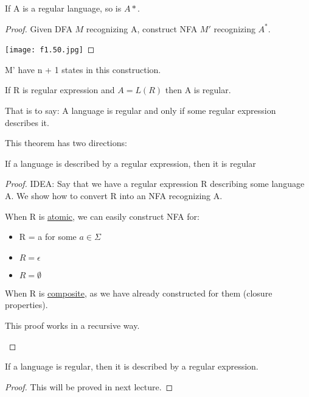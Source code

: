 \begin{theorem}
    If A is a regular language, so is \(A*\).  
\end{theorem}
\begin{proof}
    Given DFA \(M\) recognizing A, construct NFA \(M'\) recognizing \(A^*\). 

    \texttt{[image: f1.50.jpg]}
\end{proof}
\begin{remark}
    M' have n + 1 states in this construction.
\end{remark}

\begin{theorem}
    If R is regular expression and \(A = L(R)\) then A is regular. 

    That is to say: A language is regular and only if some regular expression describes it.

    This theorem has two directions:
    \begin{lemma}\label{lemma: 2.1}
        If a language is described by a regular expression, then it is regular
    \end{lemma}
    \begin{proof}
        IDEA: Say that we have a regular expression R describing some language A.
        We show how to convert R into an NFA recognizing A.

        When R is \underline{atomic}, we can easily construct NFA for:
        \begin{itemize}
            \item R = a for some \(a \in \Sigma\)
            \item \(R = \epsilon\)
            \item \(R = \emptyset\)   
        \end{itemize}

        When R is \underline{composite}, as we have already constructed for them (closure properties).

        \begin{note}
            This proof works in a recursive way. 
        \end{note}
    \end{proof}

    \begin{lemma}\label{lemma: 2.2}
        If a language is regular, then it is described by a regular expression.  
    \end{lemma}
    \begin{proof}
        This will be proved in next lecture.
    \end{proof}
\end{theorem}
